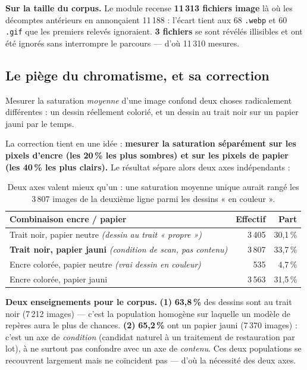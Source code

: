 \documentclass[11pt,a4paper]{article}
\newcommand{\aretenir}[1]{%
  \par\medskip
  \noindent\colorbox{encadre}{%
    \begin{minipage}{\dimexpr\linewidth-2\fboxsep}
      \vspace{2pt}#1\vspace{2pt}
    \end{minipage}}%
  \par\medskip
}
\newcommand{\alerte}[1]{\textcolor{alerte}{\textbf{#1}}}
\begin{document}
\aretenir{\textbf{Sur la taille du corpus.} Le module recense
\textbf{11\,313 fichiers image} là où les décomptes antérieurs en annonçaient
11\,188 : l'écart tient aux 68 \texttt{.webp} et 60 \texttt{.gif} que les
premiers relevés ignoraient. \textbf{3 fichiers} se sont révélés illisibles et
ont été ignorés sans interrompre le parcours — d'où 11\,310 mesures.}

\subsection{Le piège du chromatisme, et sa correction}

Mesurer la saturation \emph{moyenne} d'une image confond deux choses radicalement
différentes : un dessin réellement colorié, et un dessin au trait noir sur un
papier jauni par le temps.

La correction tient en une idée : \textbf{mesurer la saturation séparément sur
les pixels d'encre (les 20\,\% les plus sombres) et sur les pixels de papier
(les 40\,\% les plus clairs).} Le résultat sépare alors deux axes indépendants :

\begin{table}[h]
\centering\small
\begin{tabularx}{\textwidth}{Yrr}
\toprule
\textbf{Combinaison encre / papier} & \textbf{Effectif} & \textbf{Part} \\
\midrule
Trait noir, papier neutre \quad\emph{(dessin au trait « propre »)}
  & 3\,405 & 30,1\,\% \\
\alerte{Trait noir, papier jauni} \quad\emph{(condition de scan, pas contenu)}
  & 3\,807 & 33,7\,\% \\
Encre colorée, papier neutre \quad\emph{(vrai dessin en couleur)}
  & \phantom{0}\phantom{0}535 & \phantom{0}4,7\,\% \\
Encre colorée, papier jauni
  & 3\,563 & 31,5\,\% \\
\bottomrule
\end{tabularx}
\caption{Deux axes valent mieux qu'un : une saturation moyenne unique aurait
rangé les 3\,807 images de la deuxième ligne parmi les dessins « en couleur ».}
\end{table}

\aretenir{\textbf{Deux enseignements pour le corpus.}
\textbf{(1)} \textbf{63,8\,\%} des dessins sont au trait noir (7\,212 images) —
c'est la population homogène sur laquelle un modèle de repères aura le plus de
chances. \textbf{(2)} \textbf{65,2\,\%} ont un papier jauni (7\,370 images) :
c'est un axe de \emph{condition} (candidat naturel à un traitement de
restauration par lot), à ne surtout pas confondre avec un axe de \emph{contenu}.
Ces deux populations se recouvrent largement mais ne coïncident pas — d'où la
nécessité des deux axes.}
\end{document}
